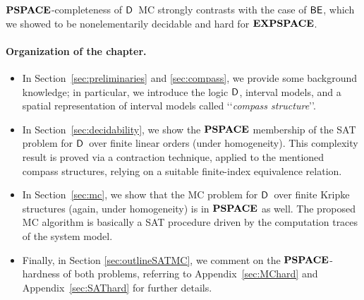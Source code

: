 $\textbf{PSPACE}$-completeness of $\mathsf{D}$\ MC strongly contrasts with the case of $\mathsf{BE}$, which we showed to be nonelementarily decidable and hard for $\textbf{EXPSPACE}$.

\paragraph*{Organization of the chapter.}
\begin{itemize}
	\item In Section~\ref{sec:preliminaries} and \ref{sec:compass}, we provide some background knowledge;
in particular, we introduce the logic $\mathsf{D}$, interval models, and a spatial representation of interval models called \lq\lq \emph{compass structure}\rq\rq.
	\item In Section~\ref{sec:decidability}, we show the $\textbf{PSPACE}$ membership of the SAT problem for $\mathsf{D}$\ over finite linear orders
(under homogeneity). 
This complexity result is proved via a contraction technique, applied to the mentioned compass structures, relying on a suitable finite-index equivalence relation.
	\item In Section~\ref{sec:mc}, we show that the MC problem for  $\mathsf{D}$\ over finite Kripke structures (again, under homogeneity) is in $\textbf{PSPACE}$ as well. The proposed MC algorithm is basically a SAT procedure driven by the computation traces of the system model. 
	\item Finally, 
in Section \ref{sec:outlineSATMC}, we comment on the $\textbf{PSPACE}$-hardness of both problems, referring to
Appendix~\ref{sec:MChard} and Appendix~\ref{sec:SAThard} for further details. 
\end{itemize}
